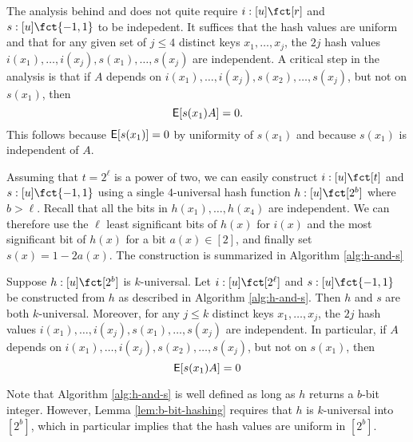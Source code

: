 The analysis behind  and  does not quite
require $i:[u]\fct[r]$ and $s:[u]\fct\{-1,1\}$ to be indepedent.
It suffices that the hash values are uniform and that for any
given set of $j\leq 4$ distinct keys $x_1,\ldots,x_j$, the $2j$ hash
values $i(x_1),\ldots,i(x_j),s(x_1),\ldots,s(x_j)$ are independent.
A critical step in the analysis is that if
$A$ depends on $i(x_1),\ldots,i(x_j),s(x_2),\ldots,s(x_j)$, but
not on $s(x_1)$, then
\[\operatorname*{\sf{E}}[s(x_1)A]=0.\]
This follows because $\operatorname*{\sf{E}}[s(x_1)]=0$ by uniformity of $s(x_1)$ and because $s(x_1)$ is independent of $A$.
  

Assuming that $t=2^\ell$ is a power of two, we can easily construct
$i:[u]\fct[t]$ and $s:[u]\fct\{-1,1\}$ using a single $4$-universal
hash function $h:[u]\fct[2^b]$ where $b>\ell$. Recall that all the bits in
$h(x_1),\ldots,h(x_4)$ are independent. We can therefore use the
$\ell$ least significant bits of $h(x)$ for $i(x)$ and the most
significant bit of $h(x)$ for a bit $a(x)\in[2]$, and finally set
$s(x)=1-2a(x)$. The construction is summarized in Algorithm \ref{alg:h-and-s}
\begin{lemma}\label{lem:b-bit-hashing} Suppose $h:[u]\fct[2^b]$ is $k$-universal. Let
  $i:[u]\fct[2^\ell]$ and
  $s:[u]\fct\{-1,1\}$ be constructed from $h$ as described in Algorithm \ref{alg:h-and-s}. Then $h$ and $s$ are both $k$-universal. Moreover, for
  any $j\leq k$ distinct keys $x_1,\ldots,x_j$, the $2j$ hash
  values $i(x_1),\ldots,i(x_j),s(x_1),\ldots,s(x_j)$ are independent.
  In particular, if $A$ depends on
  $i(x_1),\ldots,i(x_j),s(x_2),\ldots,s(x_j)$, but not on $s(x_1)$, then
\begin{equation}\label{eq:E-0}
  \operatorname*{\sf{E}}[s(x_1)A]=0
\end{equation}
\end{lemma}
Note that Algorithm \ref{alg:h-and-s} is well defined as long as 
$h$ returns a $b$-bit integer. However, Lemma \ref{lem:b-bit-hashing} requires
that $h$ is $k$-universal into $[2^b]$, which in particular implies that
the hash values are uniform in $[2^b]$.



